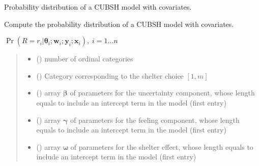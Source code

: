 \documentclass[letterpaper,10pt,english]{sphinxmanual}
\begin{document}
\begin{fulllineitems}
\label{\detokenize{cubmods:cubmods.cubsh_ywx.prob}}
\pysigstartsignatures
{}
\pysigstopsignatures
\sphinxAtStartPar
Probability distribution of a CUBSH model with covariates.

\sphinxAtStartPar
Compute the probability distribution of a CUBSH model with covariates.

\sphinxAtStartPar
\(\Pr(R = r_i | \pmb\theta_i ; \pmb w_i; \pmb y_i; \pmb x_i),\; i=1 \ldots n\)
\begin{quote}\begin{description}
\begin{itemize}
\item {} 
\sphinxAtStartPar
{} () \textendash{} number of ordinal categories

\item {} 
\sphinxAtStartPar
{} () \textendash{} Category corresponding to the shelter choice \([1,m]\)

\item {} 
\sphinxAtStartPar
{} () \textendash{} array \(\pmb \beta\) of parameters for the uncertainty component, whose length equals 
 to include an intercept term in the model (first entry)

\item {} 
\sphinxAtStartPar
{} () \textendash{} array \(\pmb \gamma\) of parameters for the feeling component, whose length equals 
 to include an intercept term in the model (first entry)

\item {} 
\sphinxAtStartPar
{} () \textendash{} array \(\pmb \omega\) of parameters for the shelter effect, whose length equals 
 to include an intercept term in the model (first entry)


\end{itemize}
\end{description}
\end{quote}
\end{fulllineitems}
\end{document}
